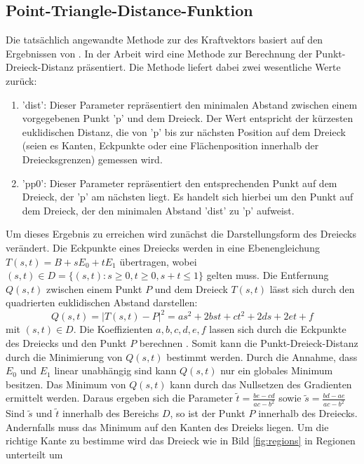 \documentclass[conference]{IEEEtran}
\begin{document}
\subsection{Point-Triangle-Distance-Funktion}\label{dist}
Die tatsächlich angewandte Methode zur des Kraftvektors basiert auf den Ergebnissen 
von . In der Arbeit wird eine Methode zur Berechnung der Punkt-Dreieck-Distanz präsentiert. Die Methode liefert dabei zwei wesentliche Werte zurück:

\begin{enumerate}
\item 'dist': Dieser Parameter repräsentiert den minimalen Abstand zwischen einem vorgegebenen Punkt 'p' und dem Dreieck. Der Wert entspricht der kürzesten euklidischen Distanz, die von 'p' bis zur nächsten Position auf dem Dreieck (seien es Kanten, Eckpunkte oder eine Flächenposition innerhalb der Dreiecksgrenzen) 
gemessen wird.
\item 'pp0': Dieser Parameter repräsentiert den entsprechenden Punkt auf dem Dreieck, der 'p' am nächsten liegt. Es handelt sich hierbei um den Punkt auf dem Dreieck, der den minimalen Abstand 'dist' zu 'p' aufweist.
\end{enumerate} 

Um dieses Ergebnis zu erreichen wird zunächst die Darstellungsform des Dreiecks verändert. Die Eckpunkte eines Dreiecks werden in eine Ebenengleichung $ T(s,t) = B + sE_0 + tE_1 $ übertragen, wobei $(s, t) \in D = \{(s,t): s \geq 0, t \geq 0, s + t \leq 1 \}$ gelten muss. Die Entfernung $Q(s,t)$ zwischen einem Punkt $P$ und dem Dreieck $T(s,t)$ lässt sich durch den quadrierten euklidischen Abstand darstellen: 
\begin{equation}
    Q(s,t) = |T(s,t) - P|^2 = as^2 + 2bst + ct^2 + 2ds + 2et + f
\end{equation}
mit $(s,t) \in D$. Die Koeffizienten $a, b, c, d, e, f$ lassen sich durch die Eckpunkte des Dreiecks und den Punkt $P$ berechnen \autocite*{eberlyDistancePointTriangle}. Somit kann die Punkt-Dreieck-Distanz durch die Minimierung von $Q(s,t)$ bestimmt werden. Durch die Annahme, dass $E_0$ und $E_1$ linear unabhängig sind kann $Q(s,t)$ nur ein globales Minimum besitzen. Das Minimum von $Q(s,t)$ kann durch das Nullsetzen des Gradienten ermittelt werden. Daraus ergeben sich die Parameter $\tilde{t} = \frac{be-cd}{ac-b^2}$ sowie $\tilde{s} = \frac{bd-ae}{ac-b^2}$ Sind $\tilde{s}$ und $\tilde{t}$ innerhalb des Bereichs $D$, so ist der Punkt $P$ innerhalb des Dreiecks. Andernfalls muss das Minimum auf den Kanten des Dreieks liegen. Um die richtige Kante zu bestimme wird das Dreieck wie in Bild \ref*{fig:regions} in Regionen unterteilt um 
\end{document}
